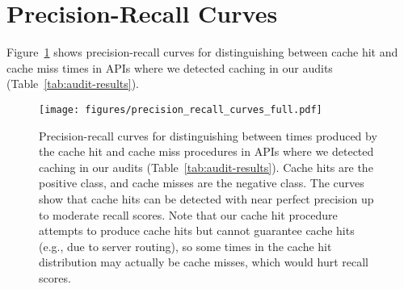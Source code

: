 \section{Precision-Recall Curves}

Figure~\ref{fig:precision-recall-curves-full} shows precision-recall curves for distinguishing between cache hit and cache miss times in APIs where we detected caching in our audits (Table~\ref{tab:audit-results}).

\begin{figure}[p]
    \centering
    \texttt{[image: figures/precision\_recall\_curves\_full.pdf]}
    \vspace{-0.2in}
    \caption{Precision-recall curves for distinguishing between times produced by the cache hit and cache miss procedures in APIs where we detected caching in our audits (Table~\ref{tab:audit-results}). Cache hits are the positive class, and cache misses are the negative class. The curves show that cache hits can be detected with near perfect precision up to moderate recall scores. Note that our cache hit procedure attempts to produce cache hits but cannot guarantee cache hits (e.g., due to server routing), so some times in the cache hit distribution may actually be cache misses, which would hurt recall scores.}
    \label{fig:precision-recall-curves-full}
\end{figure}
